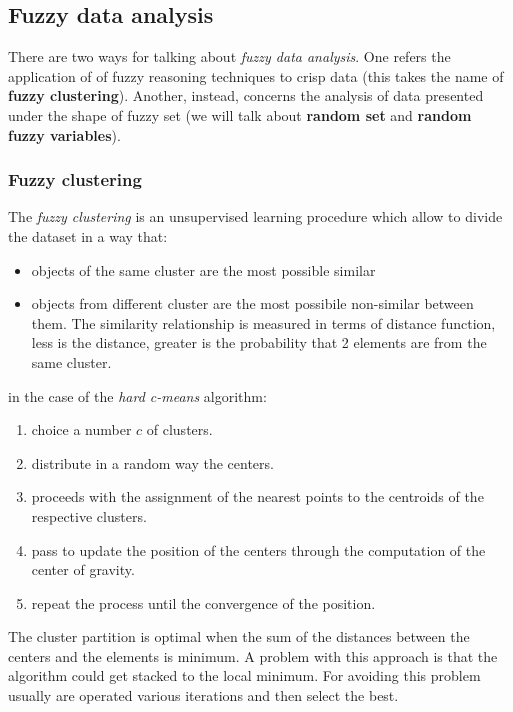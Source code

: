 \documentclass{article}
\begin{document}
\subsection{Fuzzy data analysis}
There are two ways for talking about \textit{fuzzy data analysis}. One refers the application of
of fuzzy reasoning techniques to crisp data (this takes the name of \textbf{fuzzy clustering}). Another,
instead, concerns the analysis of data presented under the shape of fuzzy set (we will talk
about \textbf{random set} and \textbf{random fuzzy variables}).

\subsubsection{Fuzzy clustering}
The \textit{fuzzy clustering} is an unsupervised learning procedure which allow to
divide the dataset in a way that:
\begin{itemize}
    \item objects of the same cluster are the most possible similar
    \item objects from different cluster are the most possibile non-similar between them.
          The similarity relationship is measured in terms of distance function, less is the
          distance, greater is the probability that 2 elements are from the same cluster.
\end{itemize}
in the case of the \textit{hard c-means} algorithm:
\begin{enumerate}
    \item choice a number $c$ of clusters.
    \item distribute in a random way the centers.
    \item proceeds with the assignment of the nearest points to the centroids
          of the respective clusters.
    \item pass to update the position of the centers through the computation
          of the center of gravity.
    \item repeat the process until the convergence of the position.
\end{enumerate}
The cluster partition is optimal when the sum of the distances between the centers and
the elements is minimum. A problem with this approach is that the algorithm could
get stacked to the local minimum. For avoiding this problem usually are operated
various iterations and then select the best.
\end{document}
